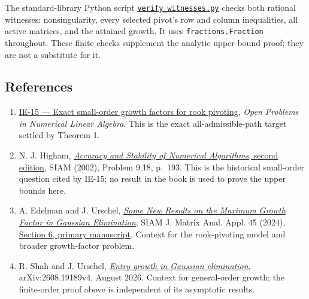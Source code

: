 \documentclass[10pt,a4paper]{article}
\providecommand{\tightlist}{\setlength{\itemsep}{0pt}\setlength{\parskip}{0pt}}
\begin{document}
The standard-library Python script
\href{https://github.com/ajt60gaibb/OpenProblemsInNLA/blob/main/references/stepaniants-ie15-2026-09-11/verification/verify_witnesses.py}{\texttt{verify\_witnesses.py}}
checks both rational witnesses: nonsingularity, every selected pivot's
row and column inequalities, all active matrices, and the attained
growth. It uses \texttt{fractions.Fraction} throughout. These finite
checks supplement the analytic upper-bound proof; they are not a
substitute for it.

\subsection{References}\label{references}

\begin{enumerate}
\def\labelenumi{\arabic{enumi}.}
\tightlist
\item
  \href{https://github.com/ajt60gaibb/OpenProblemsInNLA/blob/main/linear-systems-and-elimination/IE-15/README.md}{IE-15
  --- Exact small-order growth factors for rook pivoting}, \emph{Open
  Problems in Numerical Linear Algebra}. This is the exact
  all-admissible-path target settled by Theorem 1.
\item
  N. J. Higham,
  \href{https://doi.org/10.1137/1.9780898718027}{\emph{Accuracy and
  Stability of Numerical Algorithms}, second edition}, SIAM (2002),
  Problem 9.18, p.~193. This is the historical small-order question
  cited by IE-15; no result in the book is used to prove the upper
  bounds here.
\item
  A. Edelman and J. Urschel,
  \href{https://doi.org/10.1137/23M1571903}{\emph{Some New Results on
  the Maximum Growth Factor in Gaussian Elimination}}, SIAM J. Matrix
  Anal. Appl. 45 (2024),
  \href{https://arxiv.org/html/2303.04892v4}{Section 6, primary
  manuscript}. Context for the rook-pivoting model and broader
  growth-factor problem.
\item
  R. Shah and J. Urschel,
  \href{https://arxiv.org/html/2608.19189v4}{\emph{Entry growth in
  Gaussian elimination}}, arXiv:2608.19189v4, August 2026. Context for
  general-order growth; the finite-order proof above is independent of
  its asymptotic results.
\end{enumerate}
\end{document}
